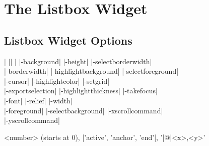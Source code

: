\section{The Listbox Widget}

\subsection*{Listbox Widget Options}
\begin{tabbing}
|                    |\=|                    |\= \kill                    
|-background|        \> |-height|             \> |-selectborderwidth| \\
|-borderwidth|       \> |-highlightbackground| \> |-selectforeground| \\
|-cursor|	     \> |-highlightcolor|     \> |-setgrid| \\         
|-exportselection|   \> |-highlightthickness| \> |-takefocus| \\
|-font|              \> |-relief|             \> |-width| \\           
|-foreground|        \> |-selectbackground|   \> |-xscrollcommand| \\  
\> \> |-yscrollcommand| \\  
\end{tabbing}

\vskip5pt
\begin{enum}{3cm}


<number> (starts at 0), |'active', 'anchor', 'end'|, '|@|<x>,<y>'

\end{enum}
 

